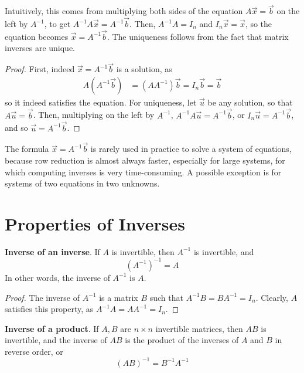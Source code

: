 \documentclass[letterpaper,12pt]{article}
\begin{document}
Intuitively, this comes from multiplying both sides of the equation $A\vec{x} = \vec{b}$ on the left by $A^{-1}$, to get $A^{-1}A \vec{x} = A^{-1} \vec{b}$.  Then, $A^{-1} A = I_n$ and $I_n \vec{x} = \vec{x}$, so the equation becomes $\vec{x} = A^{-1} \vec{b}$. The uniqueness follows from the fact that matrix inverses are unique.

\begin{proof}
First, indeed $\vec{x} = A^{-1} \vec{b}$ is a solution, as
\begin{align*}
    A(A^{-1} \vec{b}) & = (AA^{-1}) \vec{b} = I_n \vec{b} = \vec{b}
\end{align*}
so it indeed satisfies the equation. For uniqueness, let $\vec{u}$ be any solution, so that $A\vec{u} = \vec{b}$. Then, multiplying on the left by $A^{-1}$, $A^{-1} A \vec{u} = A^{-1} \vec{b}$, or $I_n \vec{u} = A^{-1} \vec{b}$, and so $\vec{u} = A^{-1} \vec{b}$.
\end{proof}

The formula $\vec{x} = A^{-1} \vec{b}$ is rarely used in practice to solve a system of equations, because row reduction is almost always faster, especially for large systems, for which computing inverses is very time-consuming. A possible exception is for systems of two equations in two unknowns.


\section*{Properties of Inverses}
\begin{theorem}
\textbf{Inverse of an inverse}. If $A$ is invertible, then $A^{-1}$ is invertible, and
\begin{equation*}
    \boxed{(A^{-1})^{-1} = A}
\end{equation*}
In other words, the inverse of $A^{-1}$ is $A$.
\end{theorem}

\begin{proof}
The inverse of $A^{-1}$ is a matrix $B$ such that $A^{-1} B = B A^{-1} = I_n$. Clearly, $A$ satisfies this property, as $A^{-1} A = A A^{-1} = I_n$.
\end{proof}

\begin{theorem}
\textbf{Inverse of a product}. If $A, B$ are $n \times n$ invertible matrices, then $AB$ is invertible, and the inverse of $AB$ is the product of the inverses of $A$ and $B$ in reverse order, or
\begin{equation*}
    \boxed{(AB)^{-1} = B^{-1} A^{-1}}
\end{equation*}
\end{theorem}
\end{document}

